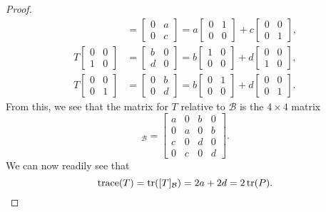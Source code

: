 \begin{proof}
\begin{align*}
    &=
    \begin{bmatrix}
      0 & a \\
      0 & c
    \end{bmatrix}
    = a
    \begin{bmatrix}
      0 & 1 \\
      0 & 0
    \end{bmatrix}
    + c
    \begin{bmatrix}
      0 & 0 \\
      0 & 1
    \end{bmatrix}, \\
    T
    \begin{bmatrix}
      0 & 0 \\
      1 & 0
    \end{bmatrix}
    &=
    \begin{bmatrix}
      b & 0 \\
      d & 0
    \end{bmatrix}
    = b
    \begin{bmatrix}
      1 & 0 \\
      0 & 0
    \end{bmatrix}
    + d
    \begin{bmatrix}
      0 & 0 \\
      1 & 0
    \end{bmatrix}, \\
    T
    \begin{bmatrix}
      0 & 0 \\
      0 & 1
    \end{bmatrix}
    &=
    \begin{bmatrix}
      0 & b \\
      0 & d
    \end{bmatrix}
    = b
    \begin{bmatrix}
      0 & 1 \\
      0 & 0
    \end{bmatrix}
    + d
    \begin{bmatrix}
      0 & 0 \\
      0 & 1
    \end{bmatrix}.
  \end{align*}
  From this, we see that the matrix for $T$ relative to $\mathcal{B}$
  is the $4\times4$ matrix
  \begin{equation*}
    [T]_{\mathcal{B}} =
    \begin{bmatrix}
      a & 0 & b & 0 \\
      0 & a & 0 & b \\
      c & 0 & d & 0 \\
      0 & c & 0 & d
    \end{bmatrix}.
  \end{equation*}
  We can now readily see that
  \begin{equation*}
    \operatorname{trace}(T) = \operatorname{tr}([T]_{\mathcal{B}}) = 2a + 2d = 2\operatorname{tr}(P). \qedhere
  \end{equation*}
\end{proof}
